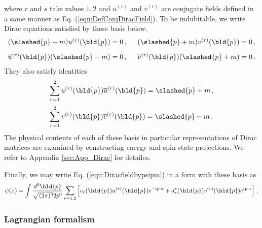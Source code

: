 where $r$ and $s$ take values $1, 2$ and
$\overline{u}^{(r)}$  and $\overline{v}^{(r)}$ 
are conjugate fields defined in a same manner as Eq. (\ref{eqn:DefConjDiracField}).
To be indubitable, we write Dirac equations satisfied by these basis below.
\begin{eqnarray}
\begin{array}{l}
(\slashed{p} - m) u^{(r)}(\bld{p}) = 0\,,
\hspace{5mm}
(\slashed{p} + m) v^{(r)}(\bld{p}) = 0\,,
\vspace{3mm}
\\
\overline{u}^{(r)}(\bld{p}) (\slashed{p} - m) = 0\,,
\hspace{5mm}
\overline{v}^{(r)}(\bld{p}) (\slashed{p} + m) = 0\,.
\end{array}
\label{eqn:DiracEqDiracspinors}
\end{eqnarray}
They also satisfy identities
\begin{eqnarray}
\begin{array}{l}
\displaystyle
\sum_{r=1}^2 u^{(r)}(\bld{p}) 
\overline{u}^{(r)}(\bld{p})
=
\slashed{p} + m\,,
\vspace{2mm}
\\
\displaystyle
\sum_{r=1}^2 v^{(r)}(\bld{p}) 
\overline{v}^{(r)}(\bld{p})
=
\slashed{p} - m\,.
\end{array}
\label{eqn:DiracspinorPolSum}
\end{eqnarray}
The physical contents of each of these basis 
in particular representations of Dirac matrices
are examined by
constructing energy and spin state projections.
We refer to Appendix \ref{sec:App_Dirac} for detailes.

Finally, we may write Eq. (\ref{eqn:Diracfieldbypsipm})  in a form with these basis as
\begin{eqnarray}
\psi(x) = \int \frac{d^3 \bld{p}}{\sqrt{(2\pi)^3} 2 p^0}
\sum_{r = 1, 2} \left[
c_r(\bld{p}) u^{(r)}(\bld{p}) e^{-ip\cdot x} + d_r^*(\bld{p}) v^{(r)}(\bld{p}) e^{ip\cdot x}
\right] \,.
\end{eqnarray}


\bigskip
\subsubsection{Lagrangian formalism}

